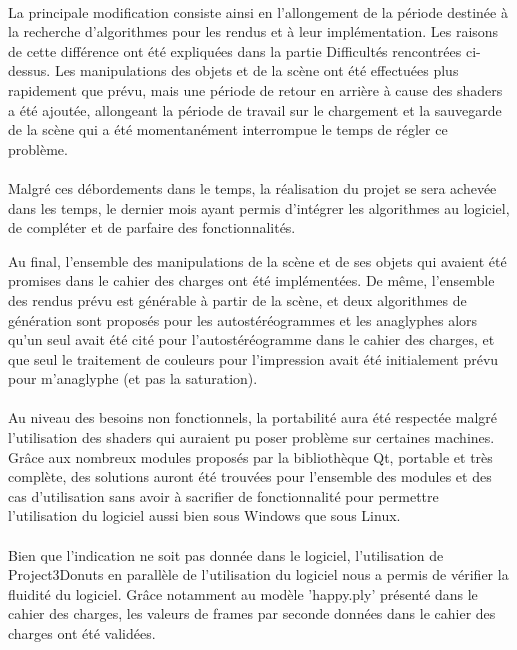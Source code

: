 \paragraph{}
La principale modification consiste ainsi en l'allongement de la période destinée à la recherche d'algorithmes pour les rendus et à leur implémentation. Les raisons de cette différence ont été expliquées dans la partie Difficultés rencontrées ci-dessus.
Les manipulations des objets et de la scène ont été effectuées plus rapidement que prévu, mais une période de retour en arrière à cause des shaders a été ajoutée, allongeant la période de travail sur le chargement et la sauvegarde de la scène qui a été momentanément interrompue le temps de régler ce problème.

\paragraph{}
Malgré ces débordements dans le temps, la réalisation du projet se sera achevée dans les temps, le dernier mois ayant permis d'intégrer les algorithmes au logiciel, de compléter et de parfaire des fonctionnalités.

Au final, l'ensemble des manipulations de la scène et de ses objets qui avaient été promises dans le cahier des charges ont été implémentées. De même, l'ensemble des rendus prévu est générable à partir de la scène, et deux algorithmes de génération sont proposés pour les autostéréogrammes et les anaglyphes alors qu'un seul avait été cité pour l'autostéréogramme dans le cahier des charges, et que seul le traitement de couleurs pour l'impression avait été initialement prévu pour m'anaglyphe (et pas la saturation).

\paragraph{}
Au niveau des besoins non fonctionnels, la portabilité aura été respectée malgré l'utilisation des shaders qui auraient pu poser problème sur certaines machines. Grâce aux nombreux modules proposés par la bibliothèque Qt, portable et très complète, des solutions auront été trouvées pour l'ensemble des modules et des cas d'utilisation sans avoir à sacrifier de fonctionnalité pour permettre l'utilisation du logiciel aussi bien sous Windows que sous Linux.

\paragraph{}
Bien que l'indication ne soit pas donnée dans le logiciel, l'utilisation de Project3Donuts en parallèle de l'utilisation du logiciel nous a permis de vérifier la fluidité du logiciel. Grâce notamment au modèle 'happy.ply' présenté dans le cahier des charges, les valeurs de frames par seconde données dans le cahier des charges ont été validées.

